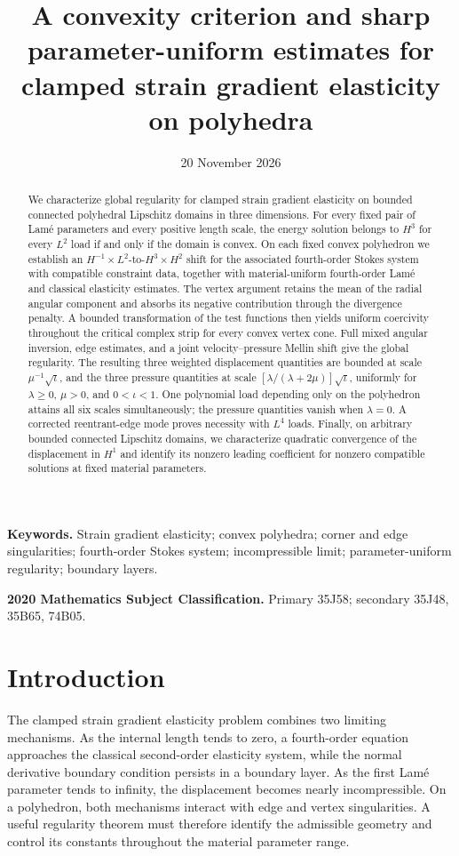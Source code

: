 \documentclass[11pt,a4paper]{article}
\title{\bfseries A convexity criterion and sharp parameter-uniform estimates for clamped strain gradient elasticity on polyhedra}
\author{}
\date{20 November 2026}
\theoremstyle{remark}
\numberwithin{equation}{section}
\begin{document}
\maketitle
\begin{abstract}
We characterize global regularity for clamped strain gradient elasticity
on bounded connected polyhedral Lipschitz domains in three dimensions.
For every fixed pair of Lam\'e parameters and every positive length
scale, the energy solution belongs to \(H^3\) for every \(L^2\) load
if and only if the domain is convex.
On each fixed convex polyhedron we establish an
\(H^{-1}\times L^2\)-to-\(H^3\times H^2\) shift for the associated
fourth-order Stokes system with compatible constraint data, together
with material-uniform fourth-order Lam\'e and classical elasticity
estimates. The vertex argument retains the mean of the radial angular
component and absorbs its negative contribution through the divergence
penalty. A bounded transformation of the test functions then yields
uniform coercivity throughout the critical complex strip for every
convex vertex cone. Full mixed angular inversion, edge estimates, and
a joint velocity--pressure Mellin shift give the global regularity.
The resulting three weighted displacement quantities are bounded at scale
\(\mu^{-1}\sqrt{\iota}\), and the three pressure quantities at scale
\([\lambda/(\lambda+2\mu)]\sqrt{\iota}\), uniformly for
\(\lambda\ge0\), \(\mu>0\), and \(0<\iota<1\).
One polynomial load depending only on the polyhedron attains all six
scales simultaneously; the pressure quantities vanish when \(\lambda=0\).
A corrected reentrant-edge mode proves necessity with \(L^4\) loads.
Finally, on arbitrary bounded connected Lipschitz domains, we
characterize quadratic convergence of the displacement in \(H^1\)
and identify its nonzero leading coefficient for nonzero compatible
solutions at fixed material parameters.
\end{abstract}
\noindent\textbf{Keywords.} Strain gradient elasticity; convex polyhedra;
corner and edge singularities; fourth-order Stokes system; incompressible
limit; parameter-uniform regularity; boundary layers.

\smallskip
\noindent\textbf{2020 Mathematics Subject Classification.} Primary 35J58;
secondary 35J48, 35B65, 74B05.

\section{Introduction}

The clamped strain gradient elasticity problem combines two limiting
mechanisms. As the internal length tends to zero, a fourth-order equation
approaches the classical second-order elasticity system, while the normal
derivative boundary condition persists in a boundary layer. As the first
Lam\'e parameter tends to infinity, the displacement becomes nearly
incompressible. On a polyhedron, both mechanisms interact with edge and
vertex singularities. A useful regularity theorem must therefore identify
the admissible geometry and control its constants throughout the material
parameter range.
\end{document}
